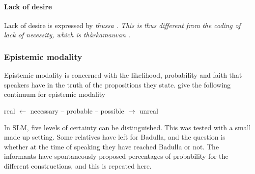 



\paragraph{Lack of desire}\label{sec:func:Lackofdesire}
Lack of desire is expressed by \em thussa \em {}. This is thus different from the coding of lack of necessity, which is \em thàrkamauvan \em {} .




\subsubsection[Epistemic]{Epistemic modality}\label{sec:func:Epistemicmodality}
Epistemic modality is concerned with the likelihood, probability and faith that speakers have in the truth of the propositions they state.
\citet[213]{FoleyEtAl1984} give the following continuum for epistemic modality

\ea real $\leftarrow$ necessary -- probable -- possible $\rightarrow$ unreal \z

In SLM, five levels of certainty can be distinguished. This was tested with a small made up setting. Some relatives have left for Badulla, and the question is whether at the time of speaking they have reached Badulla or not. The informants have spontaneously proposed percentages of probability for the different constructions, and this is repeated here.\\

